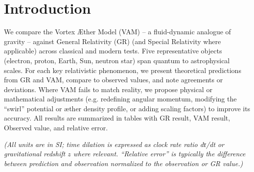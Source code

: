 \section*{Introduction}

We compare the Vortex Æther Model (VAM) – a fluid-dynamic analogue of gravity – against General Relativity (GR) (and Special Relativity where applicable) across classical and modern tests. Five representative objects (electron, proton, Earth, Sun, neutron star) span quantum to astrophysical scales. For each key relativistic phenomenon, we present theoretical predictions from GR and VAM, compare to observed values, and note agreements or deviations. Where VAM fails to match reality, we propose physical or mathematical adjustments (e.g. redefining angular momentum, modifying the “swirl” potential or æther density profile, or adding scaling factors) to improve its accuracy. All results are summarized in tables with GR result, VAM result, Observed value, and relative error.


\textit{(All units are in SI; time dilation is expressed as clock rate ratio dτ/dt or gravitational redshift $z$ where relevant. “Relative error” is typically the difference between prediction and observation normalized to the observation or GR value.)}



